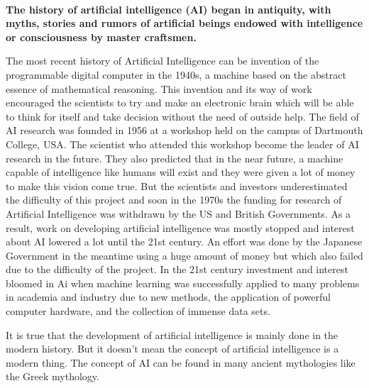 \documentclass{article}
\begin{document}
\noindent \textbf{}
\linebreak\
\noindent 
{\large \bf The history of artificial intelligence (AI) began in antiquity, with myths, stories and rumors of artificial beings endowed with intelligence or consciousness by master craftsmen.\par 

The most recent history of Artificial Intelligence can be invention of the programmable digital computer in the 1940s, a machine based on the abstract essence of mathematical reasoning. This invention and its way of work encouraged the scientists to try and make an electronic brain which will be able to think for itself and take decision without the need of outside help. The field of AI research was founded in 1956 at a workshop held on the campus of Dartmouth College, USA. The scientist who attended this workshop become the leader of AI research in the future. They also predicted that in the near future, a machine capable of intelligence like humans will exist and they were given a lot of money to make this vision come true. But the scientists and investors underestimated the difficulty of this project and soon in the 1970s the funding for research of Artificial Intelligence was withdrawn by the US and British Governments. As a result, work on developing artificial intelligence was mostly stopped and interest about AI lowered a lot until the 21st century. An effort was done by the Japanese Government in the meantime using a huge amount of money but which also failed due to the difficulty of the project. In the 21st century investment and interest bloomed in Ai when machine learning was successfully applied to many problems in academia and industry due to new methods, the application of powerful computer hardware, and the collection of immense data sets.\par 

It is true that the development of artificial intelligence is mainly done in the modern history. But it doesn’t mean the concept of artificial intelligence is a modern thing. The concept of AI can be found in many ancient mythologies like the Greek mythology.
  

}
\end{document}
